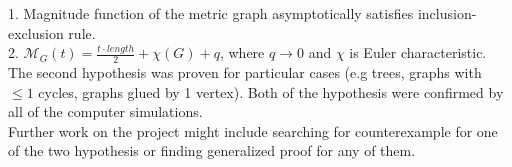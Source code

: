 \documentclass{article}
\begin{document}
1. Magnitude function of the metric graph asymptotically satisfies inclusion-exclusion rule. \\

2. $\mathcal{M}_G(t) = \frac{t \cdot length}{2} + \chi(G) + q$, where $q \rightarrow 0$ and $\chi$ is Euler characteristic.
\\

The second hypothesis was proven for particular cases (e.g trees,
graphs with $\leq 1$ cycles, graphs glued by 1 vertex).
Both of the hypothesis were confirmed by all of the computer simulations. \\

Further work on the project might include searching for counterexample for one of 
the two hypothesis or finding generalized proof for any of them. \\

\printbibliography
\end{document}
